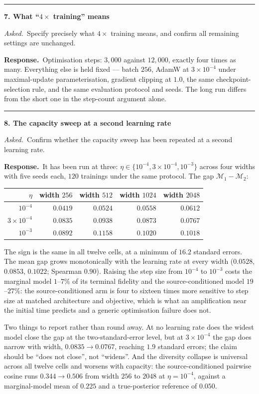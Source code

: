 \documentclass[11pt]{article}
\newcommand{\M}{\mathcal M}
\newenvironment{item12}[1]{%
  \par\medskip\noindent\rule{\textwidth}{0.7pt}\par\nobreak\smallskip
  \noindent\textbf{\large #1}\par\nobreak\smallskip
}{\par\medskip}
\newcommand{\ask}[1]{\noindent\emph{Asked.}\ #1\par\smallskip}
\newcommand{\resp}{\noindent\textbf{Response.}\ }
\begin{document}
\begin{item12}{7. What ``$4\times$ training'' means}
\ask{Specify precisely what $4\times$ training means, and confirm all remaining settings are
unchanged.}

\resp Optimisation steps: $3{,}000$ against $12{,}000$, exactly four times as many. Everything
else is held fixed --- batch $256$, AdamW at $3\times10^{-4}$ under maximal-update
parameterisation, gradient clipping at $1.0$, the same checkpoint-selection rule, and the same
evaluation protocol and seeds. The long run differs from the short one in the step-count argument
alone.
\end{item12}

\begin{item12}{8. The capacity sweep at a second learning rate}
\ask{Confirm whether the capacity sweep has been repeated at a second learning rate.}

\resp It has been run at three: $\eta\in\{10^{-4},3\times10^{-4},10^{-3}\}$ across four widths
with five seeds each, $120$ trainings under the same protocol. The gap $\M_1-\M_2$:

\begin{center}
\small
\begin{tabular}{@{}rrrrr@{}}
\toprule
$\eta$ & width $256$ & width $512$ & width $1024$ & width $2048$\\
\midrule
$10^{-4}$        & $0.0419$ & $0.0524$ & $0.0558$ & $0.0612$\\
$3\times10^{-4}$ & $0.0835$ & $0.0938$ & $0.0873$ & $0.0767$\\
$10^{-3}$        & $0.0892$ & $0.1158$ & $0.1020$ & $0.1018$\\
\bottomrule
\end{tabular}
\end{center}

The sign is the same in all twelve cells, at a minimum of $16.2$ standard errors. The mean gap
grows monotonically with the learning rate at every width ($0.0528$, $0.0853$, $0.1022$; Spearman
$0.90$). Raising the step size from $10^{-4}$ to $10^{-3}$ costs the marginal model $1$--$7\%$ of
its terminal fidelity and the source-conditioned model $19$--$27\%$: the source-conditioned arm
is four to sixteen times more sensitive to step size at matched architecture and objective, which
is what an amplification near the initial time predicts and a generic optimisation failure does
not.

Two things to report rather than round away. At no learning rate does the widest model close the
gap at the two-standard-error level, but at $3\times10^{-4}$ the gap does narrow with width,
$0.0835\to0.0767$, reaching $1.9$ standard errors; the claim should be ``does not close'', not
``widens''. And the diversity collapse is universal across all twelve cells and worsens with
capacity: the source-conditioned pairwise cosine runs $0.344\to0.506$ from width $256$ to $2048$
at $\eta=10^{-4}$, against a marginal-model mean of $0.225$ and a true-posterior reference of
$0.050$.
\end{item12}
\end{document}

